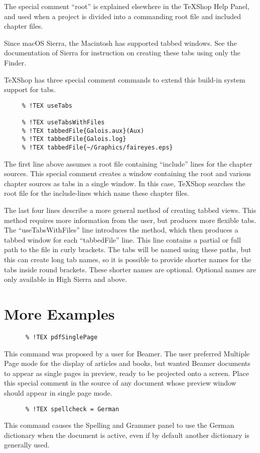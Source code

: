 \documentclass[11pt, oneside]{article}   	%
\begin{document}
 The special comment ``root'' is explained elsewhere in the TeXShop Help Panel, and used when a project is divided into a commanding root file and included chapter files. 
 
 Since macOS Sierra, the Macintosh has supported tabbed windows. See the documentation of Sierra for  instruction on creating these tabs using only the Finder. 
  
 TeXShop has three special comment commands to extend this build-in system support for tabs. 
 
 \begin{verbatim}
     % !TEX useTabs
	
     % !TEX useTabsWithFiles
     % !TEX tabbedFile{Galois.aux}(Aux)
     % !TEX tabbedFile{Galois.log}
     % !TEX tabbedFile{~/Graphics/faireyes.eps}
 \end{verbatim}
 The first line above assumes a root file containing ``include'' lines for the chapter sources. This special comment creates a window containing the root and various chapter sources as tabs in a single window.
 In this case, TeXShop searches the root file for the include-lines which name these chapter files.
 
 The last four lines describe a more general method of creating tabbed views. This method requires more
 information from the user, but produces more flexible tabs. The ``useTabsWithFiles'' line introduces the method, which then produces a tabbed window for each ``tabbedFile'' line. This line contains a partial or full path to the file in curly brackets. The tabs will be named using these paths, but this can create long tab names, so it is possible to provide  shorter names for the tabs inside round brackets. These
 shorter names are optional. Optional names are only available in High Sierra and above.
 
 \section{More Examples}
 \begin{verbatim}
      % !TEX pdfSinglePage
 \end{verbatim}
 This command was proposed by a user for  Beamer. The user preferred Multiple Page mode for the  display of articles and books, but wanted Beamer documents to appear as single pages in preview, ready to be projected onto a screen. Place this special comment in the source of any document whose preview window should appear in single page mode.
 
  \begin{verbatim}
      % !TEX spellcheck = German
 \end{verbatim}
 This command causes the Spelling and Grammer panel to use the German dictionary when the document is active, even if by default another dictionary is generally used.
 
\end{document}
